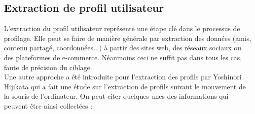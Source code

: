     \subsection{Extraction de profil utilisateur}
    L'extraction du profil utilisateur représente une étape clé dans le processus de profilage. Elle peut se faire de manière générale par extraction des données (amis, contenu partagé, coordonnées...) à partir des sites web, des réseaux sociaux ou des plateformes de e-commerce. Néanmoins ceci ne suffit pas dans tous les cas, faute de précision du ciblage.\\
    Une autre approche a été introduite pour l'extraction des profils par Yoshinori Hijikata \cite{profil} qui a fait une étude sur l'extraction de profils suivant le mouvement de la souris de l'ordinateur. On peut citer quelques unes des informations qui peuvent être ainsi collectées :
